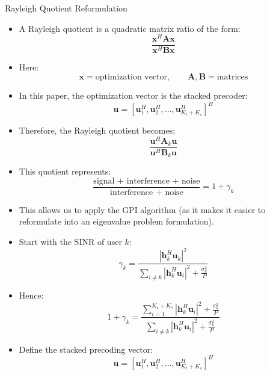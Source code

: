 \documentclass{beamer}
\begin{document}
\begin{frame}{Rayleigh Quotient Reformulation}
\small

\begin{itemize}
    \item A Rayleigh quotient is a quadratic matrix ratio of the form:
    \[
        \frac{\mathbf{x}^H\mathbf{A}\mathbf{x}}
        {\mathbf{x}^H\mathbf{B}\mathbf{x}}
    \]

    \item Here:
    \[
        \mathbf{x} = \text{optimization vector},
        \qquad
        \mathbf{A},\mathbf{B} = \text{matrices}
    \]

    \item In this paper, the optimization vector is the stacked precoder:
    \[
        \mathbf{u}
        =
        [\mathbf{u}_1^H,\mathbf{u}_2^H,\ldots,
        \mathbf{u}_{K_t+K_s}^H]^H
    \]

    \item Therefore, the Rayleigh quotient becomes:
    \[
        \frac{\mathbf{u}^H\mathbf{A}_k\mathbf{u}}
        {\mathbf{u}^H\mathbf{B}_k\mathbf{u}}
    \]

    \item This quotient represents:
    \[
        \frac{\text{signal + interference + noise}}
        {\text{interference + noise}}
        =
        1+\gamma_k
    \]

    \item This allows us to apply the GPI algorithm (as it makes it easier to reformulate into an eigenvalue problem formulation).

\end{itemize}

\end{frame}

\begin{frame}{}

\begin{itemize}
    \item Start with the SINR of user $k$:
    \[
        \gamma_k =
        \frac{
        |\mathbf{h}_k^H\mathbf{u}_k|^2
        }{
        \sum_{i\neq k}|\mathbf{h}_k^H\mathbf{u}_i|^2
        +
        \frac{\sigma_k^2}{P}
        }
    \]

    \item Hence:
    \[
        1+\gamma_k
        =
        \frac{
        \sum_{i=1}^{K_t+K_s}|\mathbf{h}_k^H\mathbf{u}_i|^2
        +
        \frac{\sigma_k^2}{P}
        }{
        \sum_{i\neq k}|\mathbf{h}_k^H\mathbf{u}_i|^2
        +
        \frac{\sigma_k^2}{P}
        }
    \]

    \item Define the stacked precoding vector:
    \[
        \mathbf{u}
        =
        [\mathbf{u}_1^H,\mathbf{u}_2^H,\ldots,
        \mathbf{u}_{K_t+K_s}^H]^H
    \]

\end{itemize}

\end{frame}
\end{document}
